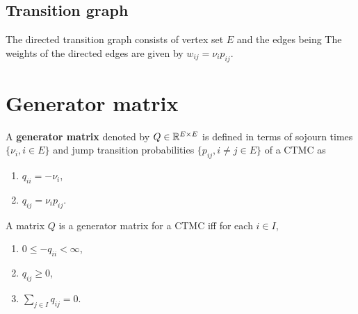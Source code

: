 \documentclass[a4paper,10pt,english]{article}
\begin{document}
\subsection{Transition graph}
The directed transition graph consists of vertex set $E$ and the edges being 
The weights of the directed edges are given by $w_{ij} = \nu_ip_{ij}$. 
\appendix
\section{Generator matrix}
A \textbf{generator matrix} denoted by $Q \in \mathbb{R}^{E \times E}$ is defined in terms of sojourn times $\{\nu_i, i \in E\}$ and jump transition probabilities $\{p_{ij}, i \neq j \in E\}$ of a CTMC as
\begin{enumerate}[i\_]
\item $q_{ii}= -\nu_i$,
\item $q_{ij}=\nu_i p_{ij}$. 
\end{enumerate}

\begin{lem} A matrix $Q$ is a generator matrix for a CTMC iff for each $i \in I$,
 \begin{enumerate}[i\_]
 \item $0 \leq -q_{ii} < \infty$, 
 \item $q_{ij} \geq 0$,
 \item $\sum_{j \in I}q_{ij}=0$.
 \end{enumerate}
 \end{lem}
\end{document}

